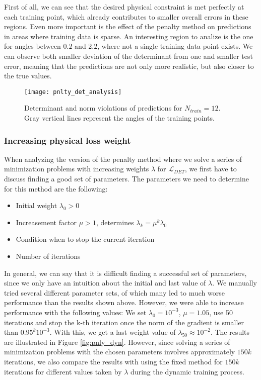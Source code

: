 \indent First of all, we can see that the desired physical constraint is met perfectly at each training point, which already contributes to smaller overall errors in these regions. Even more important is the effect of the penalty method on predictions in areas where training data is sparse. An interesting region to analize is the one for angles between $0.2$ and $2.2$, where not a single training data point exists. We can observe both smaller deviation of the determinant from one and smaller test error, meaning that the predictions are not only more realistic, but also closer to the true values.
\begin{figure}[ht]
	\texttt{[image: pnlty\_det\_analysis]}
	\caption{Determinant and norm violations of predictions for $N_{train} = 12$. Gray vertical lines represent the angles of the training points.}
	\label{fig:pnlty_det_analysis}
\end{figure}

\subsubsection{Increasing physical loss weight}
When analyzing the version of the penalty method where we solve a series of minimization problems with increasing weights $\lambda$ for $\mathcal{L}_{DET}$, we first have to discuss finding a good set of parameters. The parameters we need to determine for this method are the following:
\begin{itemize}
	\item Initial weight $\lambda_0 > 0$
	\item Increasement factor $\mu > 1$, determines $\lambda_k = \mu^k\lambda_0$
	\item Condition when to stop the current iteration
	\item Number of iterations
\end{itemize}
In general, we can say that it is difficult finding a successful set of parameters, since we only have an intuition about the initial and last value of $\lambda$. We manually tried several different parameter sets, of which many led to much worse performance than the results shown above. However, we were able to increase performance with the following values: We set $\lambda_0 = 10^{-3}$, $\mu = 1.05$, use 50 iterations and stop the k-th iteration once the norm of the gradient is smaller than $0.95^{k} 10^{-3}$. With this, we get a last weight value of $\lambda_{50} \approx 10^{-2}$. The results are illustrated in Figure \ref{fig:pnly_dyn}. However, since solving a series of minimization problems with the chosen parameters involves approximately $150k$ iterations, we also compare the results with using the fixed method for $150k$ iterations for different values taken by $\lambda$ during the dynamic training process.

